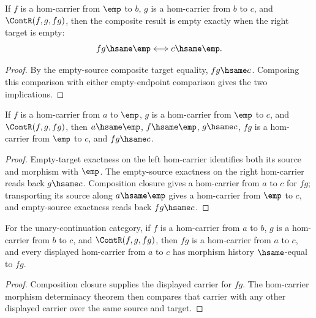 \begin{theorem}
\label{thm:category-hom-carrier-empty-source-comp-empty-result-iff}
If $f$ is a hom-carrier from $\emp$ to $b$, $g$ is a hom-carrier from $b$ to
$c$, and $\ContR(f,g,fg)$, then the composite result is empty exactly when the
right target is empty:
$$
fg\hsame\emp\Longleftrightarrow c\hsame\emp.
$$
\end{theorem}
\begin{proof}
By the empty-source composite target equality, $fg\hsame c$. Composing this
comparison with either empty-endpoint comparison gives the two implications.
\end{proof}

\begin{theorem}
\label{thm:category-hom-carrier-comp-empty-middle-inversion}
If $f$ is a hom-carrier from $a$ to $\emp$, $g$ is a hom-carrier from $\emp$
to $c$, and $\ContR(f,g,fg)$, then $a\hsame\emp$, $f\hsame\emp$, $g\hsame c$,
$fg$ is a hom-carrier from $\emp$ to $c$, and $fg\hsame c$.
\end{theorem}
\begin{proof}
Empty-target exactness on the left hom-carrier identifies both its source and
morphism with $\emp$. The empty-source exactness on the right hom-carrier reads
back $g\hsame c$. Composition closure gives a hom-carrier from $a$ to $c$ for
$fg$; transporting its source along $a\hsame\emp$ gives a hom-carrier from
$\emp$ to $c$, and empty-source exactness reads back $fg\hsame c$.
\end{proof}




\begin{theorem}
\label{thm:category-hom-carrier-comp-public-readback}
For the unary-continuation category, if \(f\) is a hom-carrier from \(a\) to
\(b\), \(g\) is a hom-carrier from \(b\) to \(c\), and \(\ContR(f,g,fg)\),
then \(fg\) is a hom-carrier from \(a\) to \(c\), and every displayed
hom-carrier from \(a\) to \(c\) has morphism history \(\hsame\)-equal to
\(fg\).
\end{theorem}
\begin{proof}
Composition closure supplies the displayed carrier for \(fg\). The
hom-carrier morphism determinacy theorem then compares that carrier with any
other displayed carrier over the same source and target.
\end{proof}

